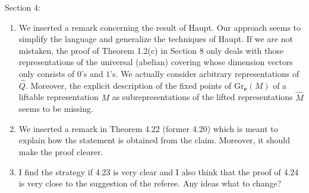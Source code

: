 \documentclass[titlepage,11pt,a4paper]{{scrartcl}}
\begin{document}
Section 4:
\begin{enumerate}
\renewcommand{\labelenumi}{(\arabic{enumi})}
\item We inserted a remark concerning the result of Haupt. Our approach seems to simplify the language and generalize the techniques of Haupt. If we are not mistaken, the proof of Theorem 1.2(c) in Section 8 only deals with those representations of the universal (abelian) covering whose dimension vectors only consists of $0$'s and $1$'s. We actually consider arbitrary representations of $\hat Q$. Moreover, the explicit description of the fixed points of $\mathrm{Gr}_{\mathbf{e}}(M)$ of a liftable representation $M$ as subrepresentations of the lifted representations $\hat M$ seems to be missing.  

\item We inserted a remark in Theorem 4.22 (former 4.20) which is meant to explain how the statement is obtained from the claim. Moreover, it should make the proof clearer.
\item I find the strategy if 4.23 is very clear and I also think that the proof of 4.24 is very close to the suggestion of the referee. Any ideas what to change?
\end{enumerate}
\end{document}
